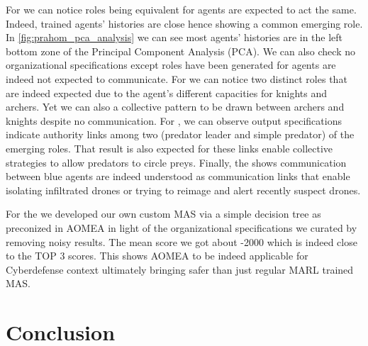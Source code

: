 \documentclass[runningheads]{llncs}
\begin{document}



For  we can notice roles being equivalent for agents are expected to act the same. Indeed, trained agents' histories are close hence showing a common emerging role. In \autoref{fig:prahom_pca_analysis} we can see most agents’ histories are in the left bottom zone of the Principal Component Analysis (PCA). We can also check no organizational specifications except roles have been generated for agents are indeed not expected to communicate. For  we can notice two distinct roles that are indeed expected due to the agent's different capacities for knights and archers. Yet we can also a collective pattern to be drawn between archers and knights despite no communication. For , we can observe output specifications indicate authority links among two (predator leader and simple predator) of the emerging roles. That result is also expected for these links enable collective strategies to allow predators to circle preys. Finally, the  shows communication between blue agents are indeed understood as communication links that enable isolating infiltrated drones or trying to reimage and alert recently suspect drones.

For the  we developed our own custom MAS via a simple decision tree as preconized in AOMEA in light of the organizational specifications we curated by removing noisy results. The mean score we got about -2000 which is indeed close to the TOP 3 scores. This shows AOMEA to be indeed applicable for Cyberdefense context ultimately bringing safer than just regular MARL trained MAS.

\section{Conclusion}


\end{document}
